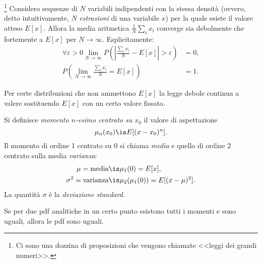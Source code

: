 \begin{fact}
	\label{th:grossnum}
	\footnote{Ci sono una dozzina di proposizioni che vengono chiamate <<leggi dei grandi numeri>>.}
	Considero sequenze di $N$ variabili indipendenti con la stessa densità (ovvero, detto intuitivamente, $N$ \emph{estrazioni} di una variabile $x$) per la quale esiste il valore atteso $E[x]$.
	Allora la media aritmetica $\frac1N\sum_ix_i$ converge sia debolmente che fortemente a $E[x]$ per $N\to\infty$.
	Esplicitamente:
	\begin{align*}
		\forall\varepsilon > 0 \lim_{N\to \infty} P\left( \left| \frac{\sum_ix_i}N - E[x] \right| > \varepsilon \right) &= 0, \\
		P\left( \lim_{N\to \infty} \frac{\sum_ix_i}N = E[x] \right) &= 1.
	\end{align*}
\end{fact}

\noindent Per certe distribuzioni che non ammettono $E[x]$ la legge debole continua a valere sostituendo $E[x]$ con un certo valore fissato.

\begin{definition}[Momenti]
	Si definisce \emph{momento $n$-esimo centrato su $x_0$} il valore di aspettazione
	\begin{equation*}
		\mu_n(x_0) \is E[(x - x_0)^n].
	\end{equation*}
	Il momento di ordine 1 centrato su 0 si chiama \emph{media} e quello di ordine 2 centrato sulla media \emph{varianza}:
	\begin{align*}
		\mu = \text{media} &\is \mu_1(0) = E[x], \\
		\sigma^2 = \text{varianza} &\is \mu_2(\mu_1(0)) = E[(x-\mu)^2].
	\end{align*}
	La quantità $\sigma$ è la \emph{deviazione standard}.
\end{definition}

\begin{fact}
	\label{th:pdfmom}
	Se per due pdf analitiche in un certo punto esistono tutti i momenti e sono uguali, allora le pdf sono uguali.
\end{fact}
